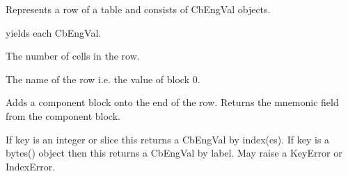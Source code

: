 \documentclass[letterpaper,10pt,english]{sphinxmanual}
\begin{document}

\begin{fulllineitems}
\label{\detokenize{ref/LIS/core/LogiRec:TotalDepth.LIS.core.LogiRec.TableRow}}
Represents a row of a table and consists of CbEngVal objects.

\begin{fulllineitems}
\label{\detokenize{ref/LIS/core/LogiRec:TotalDepth.LIS.core.LogiRec.TableRow.genCells}}
yields each CbEngVal.

\end{fulllineitems}


\begin{fulllineitems}
\label{\detokenize{ref/LIS/core/LogiRec:TotalDepth.LIS.core.LogiRec.TableRow.__len__}}
The number of cells in the row.

\end{fulllineitems}


\begin{fulllineitems}
\label{\detokenize{ref/LIS/core/LogiRec:TotalDepth.LIS.core.LogiRec.TableRow.value}}
The name of the row i.e. the value of block 0.

\end{fulllineitems}


\begin{fulllineitems}
\label{\detokenize{ref/LIS/core/LogiRec:TotalDepth.LIS.core.LogiRec.TableRow.addCb}}
Adds a component block onto the end of the row.
Returns the mnemonic field from the component block.

\end{fulllineitems}


\begin{fulllineitems}
\label{\detokenize{ref/LIS/core/LogiRec:TotalDepth.LIS.core.LogiRec.TableRow.__getitem__}}
If key is an integer or slice this returns a CbEngVal by index(es).
If key is a bytes() object then this returns a CbEngVal by label.
May raise a KeyError or IndexError.


\end{fulllineitems}
\end{fulllineitems}
\end{document}

